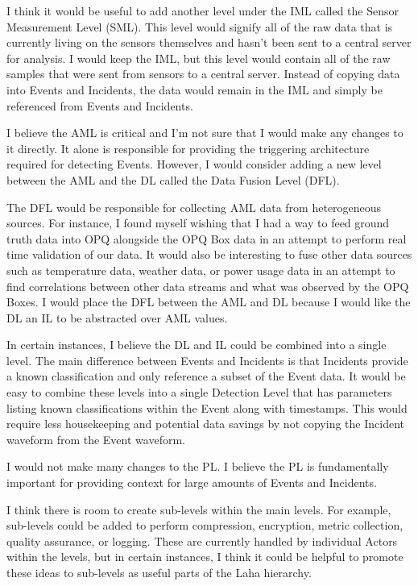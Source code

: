 I think it would be useful to add another level under the IML called the Sensor Measurement Level (SML). This level would signify all of the raw data that is currently living on the sensors themselves and hasn't been sent to a central server for analysis. I would keep the IML, but this level would contain all of the raw samples that were sent from sensors to a central server. Instead of copying data into Events and Incidents, the data would remain in the IML and simply be referenced from Events and Incidents.

I believe the AML is critical and I'm not sure that I would make any changes to it directly. It alone is responsible for providing the triggering architecture required for detecting Events. However, I would consider adding a new level between the AML and the DL called the Data Fusion Level (DFL).

The DFL would be responsible for collecting AML data from heterogeneous sources. For instance, I found myself wishing that I had a way to feed ground truth data into OPQ alongside the OPQ Box data in an attempt to perform real time validation of our data. It would also be interesting to fuse other data sources such as temperature data, weather data, or power usage data in an attempt to find correlations between other data streams and what was observed by the OPQ Boxes. I would place the DFL between the AML and DL because I would like the DL an IL to be abstracted over AML values.

In certain instances, I believe the DL and IL could be combined into a single level. The main difference between Events and Incidents is that Incidents provide a known classification and only reference a subset of the Event data. It would be easy to combine these levels into a single Detection Level that has parameters listing known classifications within the Event along with timestamps. This would require less housekeeping and potential data savings by not copying the Incident waveform from the Event waveform.

I would not make many changes to the PL. I believe the PL is fundamentally important for providing context for large amounts of Events and Incidents.

I think there is room to create sub-levels within the main levels. For example, sub-levels could be added to perform compression, encryption, metric collection, quality assurance, or logging. These are currently handled by individual Actors within the levels, but in certain instances, I think it could be helpful to promote these ideas to sub-levels as useful parts of the Laha hierarchy.

